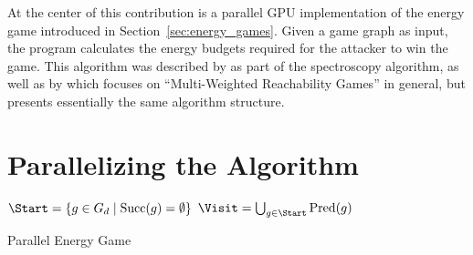 At the center of this contribution is a parallel GPU implementation
of the energy game introduced in Section~\ref{sec:energy_games}.
Given a game graph as input, the program calculates the energy budgets
required for the attacker to win the game.
This algorithm was described by \textcite{bisping2023process} as part of the
spectroscopy algorithm, as well as by \textcite{brihaye2023multi}
which focuses on \enquote{Multi-Weighted Reachability Games} in general,
but presents essentially the same algorithm structure.

\section{Parallelizing the Algorithm}\label{sec:parallelization}

\begin{algorithm}[ht]
    \DontPrintSemicolon

    $\Start = \{g \in G_d \mid \mathrm{Succ}(g) = \emptyset\}$\;
    $\Visit = \bigcup_{g \in \Start} \mathrm{Pred}(g)$\;

    \BlankLine
    \Return{\Energies}

    \caption{Parallel Energy Game}\label{alg:energy_game}
\end{algorithm}

